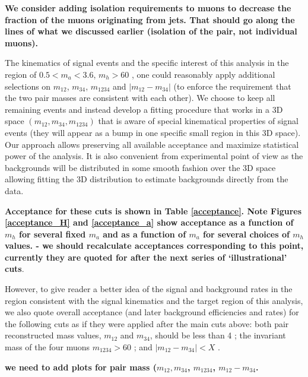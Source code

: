 \documentclass[aps,prd,onecolumn,superscriptaddress,showpacs]{revtex4}
\begin{document}
{\bf We consider adding isolation requirements to muons to decrease the fraction of the muons originating from jets.
That should go along the lines of what we discussed earlier (isolation of the pair, not individual muons).}

The kinematics of signal events and the specific interest of this analysis in the region of $0.5<m_a<3.6$, $m_h>60$ \gevcc, one could
reasonably apply additional selections on $m_{12}$, $m_{34}$, $m_{1234}$ and $|m_{12}-m_{34}|$ (to enforce the requirement that the
two pair masses are consistent with each other). We choose to keep all remaining events and instead develop a fitting procedure that 
works in a 3D space $(m_{12},m_{34}, m_{1234})$ that is aware of special kinematical properties of signal events (they will appear as 
a bump in one specific small region in this 3D space). Our approach allows preserving all available acceptance and maximize statistical 
power of the analysis. It is also convenient from experimental point of view as the backgrounds will be distributed in some smooth 
fashion over the 3D space allowing fitting the 3D distribution to estimate backgrounds directly from the data.

{\bf Acceptance for these cuts is shown in Table \ref{acceptance}. Note Figures \ref{acceptance_H} and \ref{acceptance_a} show acceptance as a 
function of $m_h$ for several fixed $m_a$ and as a function of $m_a$ for several choices of $m_h$ values. - we should recalculate acceptances
corresponding to this point, currently they are quoted for after the next series of `illustrational' cuts}.

However, to give reader a better idea of the signal and background rates in the region consistent with the signal kinematics and the target
region of this analysis, we also quote overall acceptance (and later background efficiencies and rates) for the following cuts as if they
were applied after the main cuts above: both pair reconstructed mass values, $m_{12}$ and $m_{34}$, should be less than 4 \gevcc; the invariant
mass of the four muons $m_{1234}>$60 \gevcc; and $|m_{12}-m_{34}|<X$ \gevcc. 

{\bf we need to add plots for pair mass ($m_{12},m_{34}$, $m_{1234}$, $m_{12}-m_{34}$.}
\end{document}
